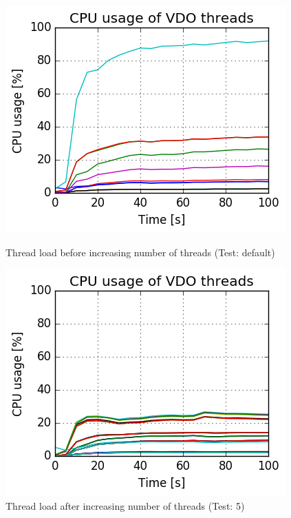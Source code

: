 \documentclass[
  color, %
  table, %
  lof,   %
  lot,   %
]{fithesis3}
\begin{document}
\begin{figure}[!htb]
\begin{minipage}{.5\textwidth}
        \includegraphics[width=\linewidth]{../results/threads/direct/low_res/tar_695_threads.png}
\caption[VDO threads load on default setting]{Thread load before increasing number of threads (Test: default)}
\label{fig:CPUdefault}
\end{minipage}
\begin{minipage}{.5\textwidth}
        \includegraphics[width=\linewidth]{../results/threads/direct/low_res/tar_770_threads.png}
\caption[VDO threads load after tuning]{Thread load after increasing number of threads (Test: 5)}
\label{fig:CPUtuning}

\end{minipage}
\end{figure}
\end{document}

